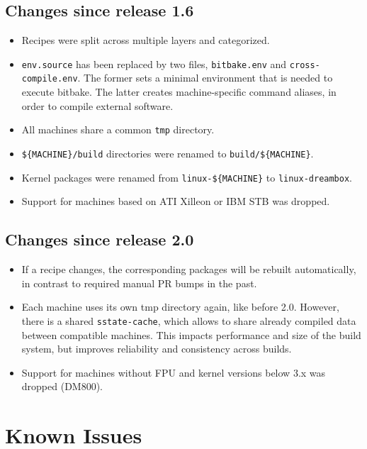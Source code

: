 \documentclass[a4paper]{article}
\newcommand{\shell}[1]{\texttt{\small #1}}
\begin{document}
  \subsection{Changes since release 1.6}
    \begin{itemize}
      \item Recipes were split across multiple layers and categorized.
      \item \shell{env.source} has been replaced by two files,
        \shell{bitbake.env} and \shell{cross-compile.env}. The former sets a minimal
        environment that is needed to execute bitbake. The latter creates
        machine-specific command aliases, in order to compile external software.
      \item All machines share a common \shell{tmp} directory.
      \item \shell{\$\{MACHINE\}/build} directories were renamed to \shell{build/\$\{MACHINE\}}.
      \item Kernel packages were renamed from \shell{linux-\$\{MACHINE\}} to \shell{linux-dreambox}.
      \item Support for machines based on ATI Xilleon or IBM STB was dropped.
    \end{itemize}

  \subsection{Changes since release 2.0}
    \begin{itemize}
      \item If a recipe changes, the corresponding packages will be rebuilt automatically,
            in contrast to required manual PR bumps in the past.
      \item Each machine uses its own tmp directory again, like before 2.0. However,
            there is a shared \shell{sstate-cache}, which allows to share already compiled
            data between compatible machines. This impacts performance and size of the
            build system, but improves reliability and consistency across builds.
      \item Support for machines without FPU and kernel versions below 3.x was dropped (DM800).
    \end{itemize}

\section{Known Issues}
\end{document}
